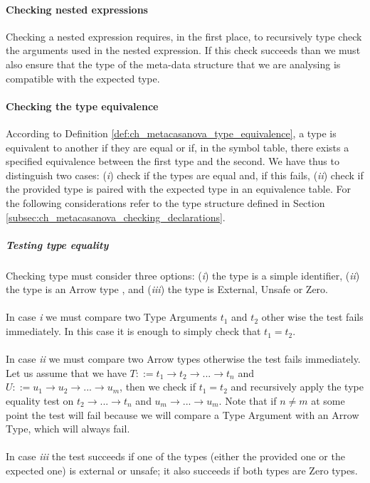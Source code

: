 \paragraph{Checking nested expressions}
Checking a nested expression requires, in the first place, to recursively type check the arguments used in the nested expression. If this check succeeds than we must also ensure that the type of the meta-data structure that we are analysing is compatible with the expected type.

\paragraph{Checking the type equivalence}
According to Definition \ref{def:ch_metacasanova_type_equivalence}, a type is equivalent to another if they are equal or if, in the symbol table, there exists a specified equivalence between the first type and the second. We have thus to distinguish two cases: (\textit{i}) check if the types are equal and, if this fails, (\textit{ii}) check if the provided type is paired with the expected type in an equivalence table. For the following considerations refer to the type structure defined in Section \ref{subsec:ch_metacasanova_checking_declarations}.

\subparagraph{Testing type equality}
Checking type must consider three options: (\textit{i}) the type is a simple identifier, (\textit{ii}) the type is an Arrow type , and (\textit{iii}) the type is External, Unsafe or Zero.\\\\
In case \textit{i} we must compare two Type Arguments $t_1$ and $t_2$ other wise the test fails immediately. In this case it is enough to simply check that $t_1 = t_2$.\\\\
In case \textit{ii} we must compare two Arrow types otherwise the test fails immediately. Let us assume that we have $T ::= t_1 \rightarrow t_2 \rightarrow ... \rightarrow t_n$ and $U ::= u_1 \rightarrow u_2 \rightarrow ... \rightarrow u_m$, then we check if $t_1 = t_2$ and recursively apply the type equality test on $t_2 \rightarrow ... \rightarrow t_n$ and $u_m \rightarrow ... \rightarrow u_m$. Note that if $n \neq m$ at some point the test will fail because we will compare a Type Argument with an Arrow Type, which will always fail.\\\\
In case \textit{iii} the test succeeds if one of the types (either the provided one or the expected one) is external or unsafe; it also succeeds if both types are Zero types.

